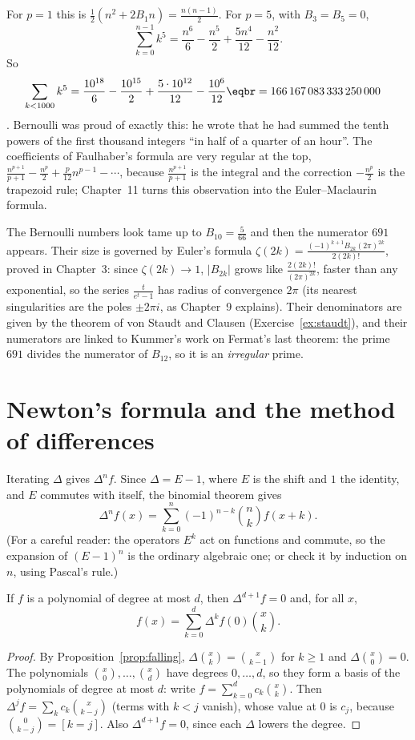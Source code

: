 For $p=1$ this is $\frac12(n^2+2B_1n)=\frac{n(n-1)}2$. For $p=5$, with $B_3=B_5=0$,
\[
\sum_{k=0}^{n-1}k^5=\frac{n^6}6-\frac{n^5}2+\frac{5n^4}{12}-\frac{n^2}{12}.
\]
So
\[
\begin{aligned}\sum_{k<1000}k^5&=\frac{10^{18}}6-\frac{10^{15}}2+\frac{5\cdot10^{12}}{12}-\frac{10^6}{12}\eqbr=166\,167\,083\,333\,250\,000\end{aligned}
\]
. Bernoulli was proud of exactly this: he wrote that he had summed the tenth powers of the
first thousand integers ``in half of a quarter of an hour''. The coefficients of Faulhaber's formula are very regular
at the top, $\frac{n^{p+1}}{p+1}-\frac{n^p}2+\frac p{12}n^{p-1}-\cdots$, because $\frac{n^{p+1}}{p+1}$ is the integral and the
correction $-\frac{n^p}2$ is the trapezoid rule; Chapter~11 turns this observation into the Euler--Maclaurin formula.

\begin{remark}
The Bernoulli numbers look tame up to $B_{10}=\frac5{66}$ and then the numerator $691$ appears. Their size is governed
by Euler's formula $\zeta(2k)=\frac{(-1)^{k+1}B_{2k}(2\pi)^{2k}}{2(2k)!}$, proved in Chapter~3: since $\zeta(2k)\to1$,
$|B_{2k}|$ grows like $\frac{2(2k)!}{(2\pi)^{2k}}$, faster than any exponential, so the series $\frac t{e^t-1}$ has radius of
convergence $2\pi$ (its nearest singularities are the poles $\pm2\pi i$, as Chapter~9 explains). Their denominators are
given by the theorem of von Staudt and Clausen (Exercise~\ref{ex:staudt}), and their numerators are linked to Kummer's
work on Fermat's last theorem: the prime $691$ divides the numerator of $B_{12}$, so it is an \emph{irregular} prime.
\end{remark}

\section{Newton's formula and the method of differences}

Iterating $\Delta$ gives $\Delta^nf$. Since $\Delta=E-1$, where $E$ is the shift and $1$ the identity, and $E$ commutes
with itself, the binomial theorem gives
\[
\Delta^nf(x)=\sum_{k=0}^n(-1)^{n-k}\binom nkf(x+k).
\]
(For a careful reader: the operators $E^k$ act on functions and commute, so the expansion of $(E-1)^n$ is the
ordinary algebraic one; or check it by induction on $n$, using Pascal's rule.)

\begin{theorem}\label{thm:newton}
If $f$ is a polynomial of degree at most $d$, then $\Delta^{d+1}f=0$ and, for all $x$,
\[
f(x)=\sum_{k=0}^d\Delta^kf(0)\binom xk.
\]
\end{theorem}
\begin{proof}
By Proposition~\ref{prop:falling}, $\Delta\binom xk=\binom x{k-1}$ for $k\ge1$ and $\Delta\binom x0=0$. The polynomials
$\binom x0,\dots,\binom xd$ have degrees $0,\dots,d$, so they form a basis of the polynomials of degree at most $d$:
write $f=\sum_{k=0}^dc_k\binom xk$. Then $\Delta^jf=\sum_kc_k\binom x{k-j}$ (terms with $k<j$ vanish), whose value at
$0$ is $c_j$, because $\binom0{k-j}=[k=j]$. Also $\Delta^{d+1}f=0$, since each $\Delta$ lowers the degree.
\end{proof}

